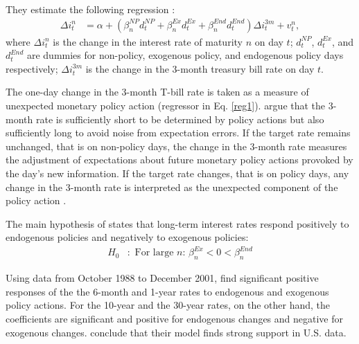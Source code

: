 \documentclass[11pt,a4paper,english,oneside]{book}
\numberwithin{equation}{chapter}
\begin{document}
They estimate the following regression \cite[~p. 13]{Ellingsen.2003}:
\begin{align}\label{reg1}
\Delta i^n_t &= \alpha + (\beta_n^{NP}d_t^{NP} + \beta_n^{Ex}d_t^{Ex} + \beta_n^{End}d_t^{End})\Delta i^{3m}_t + v_t^n,
\end{align}
where $\Delta i^n_t$ is the change in the interest rate of maturity $n$ on day $t$; $d_t^{NP}$, $d_t^{Ex}$, and $d_t^{End}$ are dummies for non-policy, exogenous policy, and endogenous policy days respectively; $\Delta i^{3m}_t$ is the change in the 3-month treasury bill rate on day $t$.

The one-day change in the 3-month T-bill rate is taken as a measure of unexpected monetary policy action (regressor in Eq. \ref{reg1}). \citet[~p. 13]{Ellingsen.2003} argue that the 3-month rate is sufficiently short to be determined by policy actions but also sufficiently long to avoid noise from expectation errors. If the target rate remains unchanged, that is on non-policy days, the change in the 3-month rate measures the adjustment of expectations about future monetary policy actions provoked by the day's new information. If the target rate changes, that is on policy days, any change in the 3-month rate is interpreted as the unexpected component of the policy action \citep[~p. 12]{Ellingsen.2003}.

The main hypothesis of \cite{Ellingsen.2003} states that long-term interest rates respond positively to endogenous policies and negatively to exogenous policies:
\begin{align}\label{H0}
H_0&:  \text{ For large $n$: } \beta_n^{Ex}<0< \beta_n^{End}
\end{align}

%

Using data from October 1988 to December 2001, \citet[~p. 16]{Ellingsen.2003} find significant positive responses of the the 6-month and 1-year rates to endogenous and exogenous policy actions. For the 10-year and the 30-year rates, on the other hand, the coefficients are significant and positive for endogenous changes and negative for exogenous changes. \citeauthor{Ellingsen.2003} conclude that their model finds strong support in U.S. data. 
\end{document}
